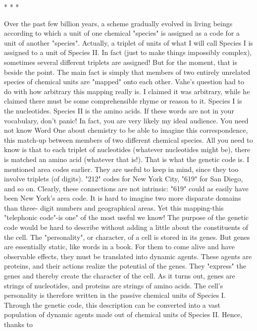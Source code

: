                                        *   *    *

         Over the past few billion years, a scheme gradually evolved in living beings
according to which a unit of one chemical "species" is assigned as a code for a unit of
another "species". Actually, a triplet of units of what I will call Species I is assigned
to a unit of Species II. In fact (just to make things impossibly complex), sometimes
several different triplets are assigned! But for the moment, that is beside the point.
The main fact is simply that members of two entirely unrelated species of chemical
units are "mapped" onto each other. Vahe's question had to do with how arbitrary this
mapping really is. I claimed it was arbitrary, while he claimed there must be some
comprehensible rhyme or reason to it.
         Species I is the nucleotides. Species II is the amino acids. If these words are
not in your vocabulary, don't panic! In fact, you are very likely my ideal audience.
You need not know Word One about chemistry to be able to imagine this
correspondence, this match-up between members of two different chemical species.
All you need to know is that to each triplet of nucleotides (whatever nucleotides might
be), there is matched an amino acid (whatever that is!). That is what the genetic code
is.
         I mentioned area codes earlier. They are useful to keep in mind, since they too
involve triplets (of digits). "212" codes for New York City, "619" for San Diego, and
so on. Clearly, these connections are not intrinsic: "619" could as easily have been
New York's area code. It is hard to imagine two more disparate domains than three-
digit numbers and geographical areas. Yet this mapping-this "telephonic code"-is one"
of the most useful we know!
         The purpose of the genetic code would be hard to describe without adding a
little about the constituents of the cell. The "personality", or character, of a cell is
stored in its genes. But genes are essentially static, like words in a book. For them to
come alive and have observable effects, they must be translated into dynamic agents.
These agents are proteins, and their actions realize the potential of the genes. They
"express" the genes and thereby create the character of the cell. As it turns out, genes
are strings of nucleotides, and proteins are strings of amino acids. The cell's
personality is therefore written in the passive chemical units of Species I. Through the
genetic code, this description can be converted into a vast population of dynamic
agents made out of chemical units of Species II. Hence, thanks to




